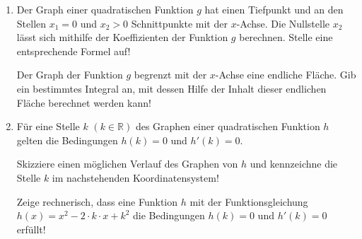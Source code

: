 \begin{langesbeispiel}
\begin{enumerate}
	\item Der Graph einer quadratischen Funktion $g$ hat einen Tiefpunkt und an den Stellen $x_1=0$ und $x_2>0$ Schnittpunkte mit der $x$-Achse. Die Nullstelle $x_2$ lässt sich mithilfe der Koeffizienten der Funktion $g$ berechnen. Stelle eine entsprechende Formel auf!\leer
	
	Der Graph der Funktion $g$ begrenzt mit der $x$-Achse eine endliche Fläche. Gib ein bestimmtes Integral an, mit dessen Hilfe der Inhalt dieser endlichen Fläche berechnet werden kann!\leer
	
	\item Für eine Stelle $k$ $(k\in\mathbb{R})$ des Graphen einer quadratischen Funktion $h$ gelten die Bedingungen $h(k)=0$ und $h'(k)=0$.
	
	 Skizziere einen möglichen Verlauf des Graphen von $h$ und kennzeichne die Stelle $k$ im nachstehenden Koordinatensystem!
	
	\begin{center}
	\end{center}
	
	Zeige rechnerisch, dass eine Funktion $h$ mit der Funktionsgleichung \mbox{$h(x)=x^2-2\cdot k\cdot x+k^2$} die Bedingungen $h(k)=0$ und $h'(k)=0$ erfüllt!
	
	
\end{enumerate}

\end{langesbeispiel}
